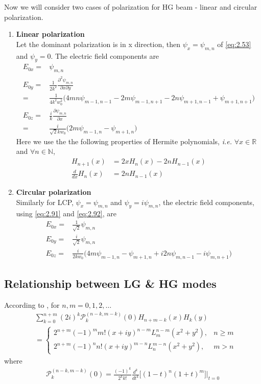 \documentclass[11pt,a4paper]{article}
\numberwithin{equation}{section}
\begin{document}
Now we will consider two cases of polarization for HG beam - linear and circular polarization.
\begin{enumerate}
	\item 
	\textbf{Linear polarization}\\
	Let the dominant polarization is in x direction, then $\psi_x=\psi_{m,n}$ of \ref{eq:2.53} and $\psi_y=0$. The electric field components are
	\begin{align}
		E_{0x} =&
		\psi_{m,n}\\
		E_{0y} =& 
		\frac{1}{2k^2}\frac{\partial^2 \psi_{m,n}}{\partial x\partial y}\nonumber \\
		=&\frac{1}{4k^2w_0^2} \big( 4mn\psi_{m-1,n-1} - 2m\psi_{m-1,n+1} - 2n\psi_{m+1,n-1} + \psi_{m+1,n+1}\big)\\
		E_{0z} =& 
		\frac{i}{k}\frac{\partial \psi_{m,n}}{\partial x}\nonumber\\
		=& \frac{i}{\sqrt{2}kw_0}\big(2m\psi_{m-1,n} - \psi_{m+1,n}\big)
	\end{align}
	Here we use the the following properties of Hermite polynomials, \cite{levedev} \textit{i.e.} $\forall x\in \mathbb{R}$ and $\forall n\in \mathbb{N}$, 
	\begin{align}
		H_{n+1}(x) &= 2x H_n(x) - 2nH_{n-1}(x)\label{eq:2.91}\\
		\frac{d}{dx}H_n(x)&=2nH_{n-1}(x)\label{eq:2.92}
	\end{align}
	
	\item 
	\textbf{Circular polarization}\\
	Similarly for LCP, $\psi_x=\psi_{m,n}$ and $\psi_y=i\psi_{m,n}$, the electric field components, using \ref{eq:2.91} and \ref{eq:2.92}, are
	\begin{align}
		E_{0x} =&
		\frac{1}{\sqrt{2}}\psi_{m,n}\\
		E_{0y} =& 
		\frac{i}{\sqrt{2}}\psi_{m,n}\\
		E_{0z} =& 
		\frac{i}{2kw_0}\big( 4m\psi_{m-1,n} - \psi_{m+1,n} + i2n\psi_{m,n-1} - i\psi_{m,n+1}\big)
	\end{align}
\end{enumerate}

\subsection{Relationship between LG \& HG modes}
According to \cite{abra 91}, for $n,m = 0,1,2,\dots$
\begin{align}
	&\sum_{k=0}^{n+m}(2i)^k \mathcal{P}_k^{(n-k,m-k)}(0)H_{n+m-k}(x)H_k(y)\nonumber\\
	&=
	\begin{cases}
		2^{n+m}(-1)^m m! (x+iy)^{n-m}L_m^{n-m}(x^2+y^2),& n\ge m\\
		2^{n+m}(-1)^n n! (x+iy)^{m-n}L_n^{m-n}(x^2+y^2),& m > n
	\end{cases}
\end{align}
where
\begin{align}
	\mathcal{P}_k^{(n-k,m-k)}(0) = \frac{(-1)^k}{2^kk!} \frac{d^k}{dt^k}\big[(1-t)^n(1+t)^m \big] \bigg|_{t=0}
\end{align}
\end{document}
